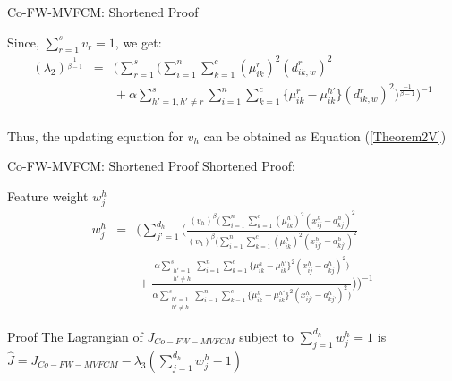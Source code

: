 \documentclass[compress,sky blue]{beamer}
\begin{document}
\begin{frame}{Co-FW-MVFCM: Shortened Proof}

Since, $\sum_{r=1}^{s}v_{r}=1 $, we get: \\

\begin{eqnarray*} 
\left( \lambda_{2} \right)^\frac{1}{\beta-1}&=&\bigg( \sum_{r=1}^{s} \Big ( \sum_{i=1}^{n}\sum_{k=1}^{c} (\mu_{ik}^{r})^{2} (d_{ik,w}^{r})^{2}\\
  &&  {} + \alpha \sum_{h'=1,h'\neq r}^{s} \sum_{i=1}^{n}\sum_{k=1}^{c} \{ \mu_{ik}^{r}-\mu_{ik}^{h'} \} (d_{ik,w}^{r})^{2} \Big)^\frac{-1}{\beta-1}\bigg)^{-1}
\end{eqnarray*}\\ 
Thus, the updating equation for $v_{h}$ can be obtained as Equation (\ref{Theorem2V}) 

\end{frame}

\begin{frame}{Co-FW-MVFCM: Shortened Proof}
\vspace{-0.7cm}
Shortened Proof:
\begin{alertblock}{Feature weight $w_{j}^{h}$}
\begin{eqnarray*}
w_{j}^{h}  & = & \Bigg ( \sum_{j’=1}^{d_{h}} \bigg ( \frac { (v_{h})^{\beta} \big ( \sum_{i=1}^{n}\sum_{k=1}^{c}(\mu_{ik}^{h})^{2}(x_{ij}^{h}-a_{kj}^{h})^{2} }  {(v_{h})^{\beta} \big ( \sum_{i=1}^{n}\sum_{k=1}^{c}(\mu_{ik}^{h})^{2}(x_{ij’}^{h}-a_{kj’}^{h})^{2}  } \\
  & & {} + \frac {\alpha \sum_{\substack{h'= 1\\ h'\ne h}}^{s} \sum_{i=1}^{n}\sum_{k=1}^{c}\{ \mu_{ik}^{h}-\mu_{ik}^{h'} \}^{2} (x_{ij}^{h}-a_{kj}^{h})^{2}  \big ) } {\alpha  \sum_{\substack{h'= 1\\ h'\ne h}}^{s} \sum_{i=1}^{n}\sum_{k=1}^{c}\{ \mu_{ik}^{h}-\mu_{ik}^{h'} \}^{2} (x_{ij’}^{h}-a_{kj’}^{h})^{2}  \big )}  \bigg ) \Bigg )^{-1}
\end{eqnarray*}
\end{alertblock}
\underline{Proof} The Lagrangian of $J_{Co-FW-MVFCM}$  subject to $\sum_{j=1}^{d_{h}}w_{j}^{h}=1 $ is  $\hat{J}=J_{Co-FW-MVFCM}-\lambda_{3} \left(\sum_{j=1}^{d_{h}}w_{j}^{h} - 1 \right)$\\

\end{frame}
\end{document}
